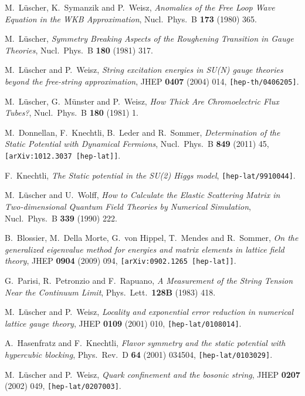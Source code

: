 \documentclass{PoS}
\begin{document}
\begin{thebibliography}{99}
  M.~L{\"u}scher, K.~Symanzik and P.~Weisz,
  \emph{Anomalies of the Free Loop Wave Equation in the WKB Approximation},
  Nucl.\ Phys.\ B {\bf 173} (1980) 365.

  M.~L{\"u}scher,
  \emph{Symmetry Breaking Aspects of the Roughening Transition in Gauge Theories},
  Nucl.\ Phys.\ B {\bf 180} (1981) 317.

  M.~L{\"u}scher and P.~Weisz,
  \emph{String excitation energies in SU(N) gauge theories beyond the free-string approximation},
  JHEP {\bf 0407} (2004) 014,
  {\tt [hep-th/0406205]}.

  M.~L{\"u}scher, G.~M{\"u}nster and P.~Weisz,
  \emph{How Thick Are Chromoelectric Flux Tubes?},
  Nucl.\ Phys.\ B {\bf 180} (1981) 1.

  M.~Donnellan, F.~Knechtli, B.~Leder and R.~Sommer,
  \emph{Determination of the Static Potential with Dynamical Fermions},
  Nucl.\ Phys.\ B {\bf 849} (2011) 45,
  {\tt [arXiv:1012.3037 [hep-lat]]}.

  F.~Knechtli,
  \emph{The Static potential in the SU(2) Higgs model},
  {\tt [hep-lat/9910044]}.

  M.~L{\"u}scher and U.~Wolff,
  \emph{How to Calculate the Elastic Scattering Matrix in Two-dimensional Quantum Field Theories by Numerical Simulation},
  Nucl.\ Phys.\ B {\bf 339} (1990) 222.

  B.~Blossier, M.~Della Morte, G.~von Hippel, T.~Mendes and R.~Sommer,
  \emph{On the generalized eigenvalue method for energies and matrix elements in lattice field theory},
  JHEP {\bf 0904} (2009) 094,
  {\tt [arXiv:0902.1265 [hep-lat]]}.

  G.~Parisi, R.~Petronzio and F.~Rapuano,
  \emph{A Measurement of the String Tension Near the Continuum Limit},
  Phys.\ Lett.\  {\bf 128B} (1983) 418.

  M.~L{\"u}scher and P.~Weisz,
  \emph{Locality and exponential error reduction in numerical lattice gauge theory},
  JHEP {\bf 0109} (2001) 010,
  {\tt [hep-lat/0108014]}.

  A.~Hasenfratz and F.~Knechtli,
  \emph{Flavor symmetry and the static potential with hypercubic blocking},
  Phys.\ Rev.\ D {\bf 64} (2001) 034504,
  {\tt [hep-lat/0103029]}.

  M.~L{\"u}scher and P.~Weisz,
  \emph{Quark confinement and the bosonic string},
  JHEP {\bf 0207} (2002) 049,
  {\tt [hep-lat/0207003]}.


\end{thebibliography}
\end{document}
